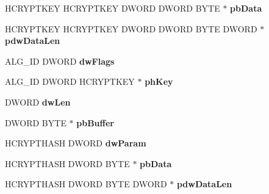 \begin{DoxyCompactItemize}
\mbox{\label{structtag_p_r_o_v_f_u_n_c_s_a02b6a098c8f7c9ca4082d926f6b27ef6}} 
H\+C\+R\+Y\+P\+T\+K\+EY H\+C\+R\+Y\+P\+T\+K\+EY D\+W\+O\+RD D\+W\+O\+RD B\+Y\+TE $\ast$ {\bfseries pb\+Data}
\item 
\mbox{\label{structtag_p_r_o_v_f_u_n_c_s_aeefb17fdadc04aee02a9c9006c2cc34c}} 
H\+C\+R\+Y\+P\+T\+K\+EY H\+C\+R\+Y\+P\+T\+K\+EY D\+W\+O\+RD D\+W\+O\+RD B\+Y\+TE D\+W\+O\+RD $\ast$ {\bfseries pdw\+Data\+Len}
\item 
\mbox{\label{structtag_p_r_o_v_f_u_n_c_s_add757fe2ece42fec709ea0c8222243dd}} 
A\+L\+G\+\_\+\+ID D\+W\+O\+RD {\bfseries dw\+Flags}
\item 
\mbox{\label{structtag_p_r_o_v_f_u_n_c_s_aae49f6a2087a7798ea7ac0c3801169e7}} 
A\+L\+G\+\_\+\+ID D\+W\+O\+RD H\+C\+R\+Y\+P\+T\+K\+EY $\ast$ {\bfseries ph\+Key}
\item 
\mbox{\label{structtag_p_r_o_v_f_u_n_c_s_a8c70789a71a223a284907cf1850afa46}} 
D\+W\+O\+RD {\bfseries dw\+Len}
\item 
\mbox{\label{structtag_p_r_o_v_f_u_n_c_s_acd2015860223a09ac8688dcbc25e8fdd}} 
D\+W\+O\+RD B\+Y\+TE $\ast$ {\bfseries pb\+Buffer}
\item 
\mbox{\label{structtag_p_r_o_v_f_u_n_c_s_a4bb6f301be69df4ed5e2ee2bf1b8499b}} 
H\+C\+R\+Y\+P\+T\+H\+A\+SH D\+W\+O\+RD {\bfseries dw\+Param}
\item 
\mbox{\label{structtag_p_r_o_v_f_u_n_c_s_a31b2196d66478bd29c4752e87ca479bf}} 
H\+C\+R\+Y\+P\+T\+H\+A\+SH D\+W\+O\+RD B\+Y\+TE $\ast$ {\bfseries pb\+Data}
\item 
\mbox{\label{structtag_p_r_o_v_f_u_n_c_s_ab517ba0a7700c5c49d7ac7b2e41b17b5}} 
H\+C\+R\+Y\+P\+T\+H\+A\+SH D\+W\+O\+RD B\+Y\+TE D\+W\+O\+RD $\ast$ {\bfseries pdw\+Data\+Len}
\item 
\mbox{\label{structtag_p_r_o_v_f_u_n_c_s_ae4a729c9243e2641c034e995463a1959}} 

\end{DoxyCompactItemize}
